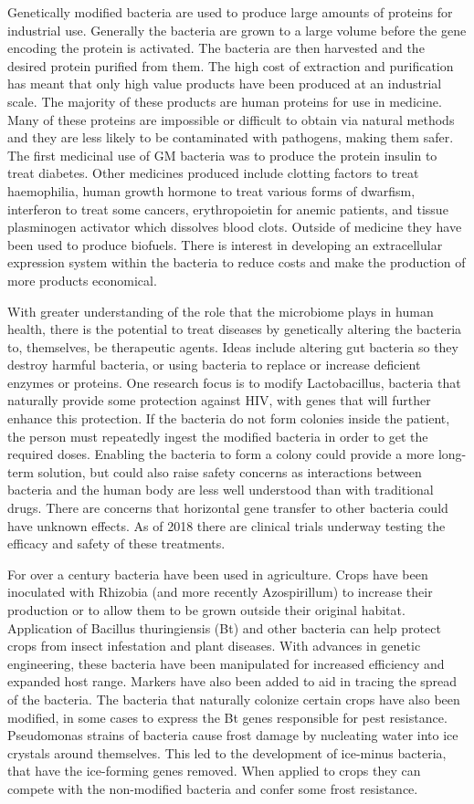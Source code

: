 Genetically modified bacteria are used to produce large amounts of proteins for industrial use. Generally the bacteria are grown to a large volume before the gene encoding the protein is activated. The bacteria are then harvested and the desired protein purified from them. The high cost of extraction and purification has meant that only high value products have been produced at an industrial scale. The majority of these products are human proteins for use in medicine. Many of these proteins are impossible or difficult to obtain via natural methods and they are less likely to be contaminated with pathogens, making them safer. The first medicinal use of GM bacteria was to produce the protein insulin to treat diabetes. Other medicines produced include clotting factors to treat haemophilia, human growth hormone to treat various forms of dwarfism, interferon to treat some cancers, erythropoietin for anemic patients, and tissue plasminogen activator which dissolves blood clots. Outside of medicine they have been used to produce biofuels. There is interest in developing an extracellular expression system within the bacteria to reduce costs and make the production of more products economical.

With greater understanding of the role that the microbiome plays in human health, there is the potential to treat diseases by genetically altering the bacteria to, themselves, be therapeutic agents. Ideas include altering gut bacteria so they destroy harmful bacteria, or using bacteria to replace or increase deficient enzymes or proteins. One research focus is to modify Lactobacillus, bacteria that naturally provide some protection against HIV, with genes that will further enhance this protection. If the bacteria do not form colonies inside the patient, the person must repeatedly ingest the modified bacteria in order to get the required doses. Enabling the bacteria to form a colony could provide a more long-term solution, but could also raise safety concerns as interactions between bacteria and the human body are less well understood than with traditional drugs. There are concerns that horizontal gene transfer to other bacteria could have unknown effects. As of 2018 there are clinical trials underway testing the efficacy and safety of these treatments.

For over a century bacteria have been used in agriculture. Crops have been inoculated with Rhizobia (and more recently Azospirillum) to increase their production or to allow them to be grown outside their original habitat. Application of Bacillus thuringiensis (Bt) and other bacteria can help protect crops from insect infestation and plant diseases. With advances in genetic engineering, these bacteria have been manipulated for increased efficiency and expanded host range. Markers have also been added to aid in tracing the spread of the bacteria. The bacteria that naturally colonize certain crops have also been modified, in some cases to express the Bt genes responsible for pest resistance. Pseudomonas strains of bacteria cause frost damage by nucleating water into ice crystals around themselves. This led to the development of ice-minus bacteria, that have the ice-forming genes removed. When applied to crops they can compete with the non-modified bacteria and confer some frost resistance.


